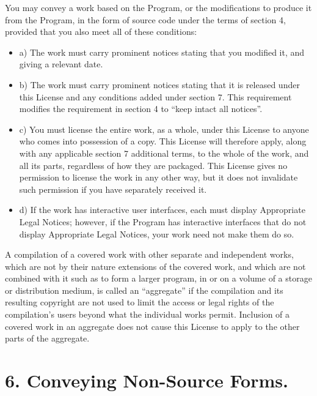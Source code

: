 \documentclass[11pt,a4paper]{article}
\begin{document}
You may convey a work based on the Program, or the modifications to
produce it from the Program, in the form of source code under the terms
of section 4, provided that you also meet all of these conditions:
\begin{itemize}
\item a) The work must carry prominent notices stating that you modified
it, and giving a relevant date.
\item b) The work must carry prominent notices stating that it is
released under this License and any conditions added under section 7.
This requirement modifies the requirement in section 4 to “keep intact
all notices”.
\item c) You must license the entire work, as a whole, under this
License to anyone who comes into possession of a copy. This License will
therefore apply, along with any applicable section 7 additional terms,
to the whole of the work, and all its parts, regardless of how they are
packaged. This License gives no permission to license the work in any
other way, but it does not invalidate such permission if you have
separately received it.
\item d) If the work has interactive user interfaces, each must display
Appropriate Legal Notices; however, if the Program has interactive
interfaces that do not display Appropriate Legal Notices, your work need
not make them do so.
\end{itemize}


A compilation of a covered work with other separate and independent
works, which are not by their nature extensions of the covered work, and
which are not combined with it such as to form a larger program, in or
on a volume of a storage or distribution medium, is called an
“aggregate” if the compilation and its resulting copyright are not used
to limit the access or legal rights of the compilation's users beyond
what the individual works permit. Inclusion of a covered work in an
aggregate does not cause this License to apply to the other parts of the
aggregate.

\part*{6. Conveying Non-Source Forms.}
\end{document}
